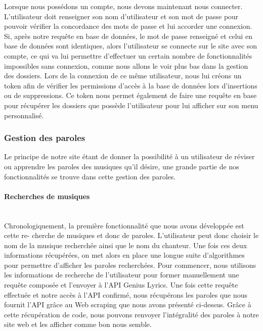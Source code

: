 \documentclass[12pt,french]{article}
\begin{document}
Lorsque nous possédons un compte, nous devons maintenant nous connecter. L'utilisateur doit renseigner son nom d'utilisateur et son mot de passe pour pouvoir vérifier la concordance des mots de passe et lui accorder une connexion. Si, après notre requête en base de données, le mot de passe renseigné et celui en base de données sont identiques, alors l'utilisateur se connecte sur le site avec son compte, ce qui va lui permettre d'effectuer un certain nombre de fonctionnalités impossibles sans connexion, comme nous allons le voir plus bas dans la gestion des dossiers. Lors de la connexion de ce même utilisateur, nous lui créons un \gls{token} afin de vérifier les permissions d'accès à la base de données lors d'insertions ou de suppressions. Ce \gls{token} nous permet également de faire une requête en base pour récupérer les dossiers que possède l'utilisateur pour lui afficher sur son menu personnalisé.

\subsubsection{Gestion des paroles}

Le principe de notre site étant de donner la possibilité à un utilisateur de réviser ou apprendre les paroles des musiques qu'il désire, une grande partie de nos fonctionnalités se trouve dans cette gestion des paroles. 

\paragraph{Recherches de musiques \\\\}

Chronologiquement, la première fonctionnalité que nous avons développée est cette re- cherche de musiques et donc de paroles. L'utilisateur peut donc choisir le nom de la musique recherchée ainsi que le nom du chanteur. Une fois ces deux informations récupérées, on met alors en place une longue suite d'algorithmes pour permettre d'afficher les paroles recherchées. Pour commencer, nous utilisons les informations de recherche de l'utilisateur pour former manuellement une requête composée et l'envoyer à l'\gls{API} Genius Lyrics. Une fois cette requête effectuée et notre accès à l'\gls{API} confirmé, nous récupérons les paroles que nous fournit l'\gls{API} grâce au \gls{Web scraping} que nous avons présenté ci-dessus. Grâce à cette récupération de code, nous pouvons renvoyer l'intégralité des paroles à notre site web et les afficher comme bon nous semble.
\end{document}

